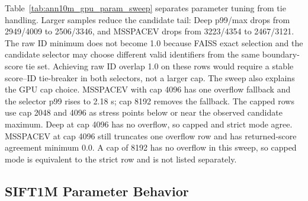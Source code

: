 Table~\ref{tab:ann10m_gpu_param_sweep} separates parameter tuning from tie
handling. Larger samples reduce the candidate tail: Deep p99/max drops from
2949/4009 to 2506/3346, and MSSPACEV drops from 3223/4354 to 2467/3121. The
raw ID minimum does not become 1.0 because FAISS exact selection and the
candidate selector may choose different valid identifiers from the same
boundary-score tie set. Achieving raw ID overlap 1.0 on these rows would require
a stable score--ID tie-breaker in both selectors, not a larger cap. The sweep
also explains the GPU cap choice. MSSPACEV with cap 4096 has one overflow
fallback and the selector p99 rises to 2.18 s; cap 8192 removes the fallback.
The capped rows use cap 2048 and 4096 as stress points below or near the
observed candidate maximum. Deep at cap 4096 has no overflow, so capped and
strict mode agree. MSSPACEV at cap 4096 still truncates one overflow row and
has returned-score agreement minimum 0.0. A cap of 8192 has no overflow in this
sweep, so capped mode is equivalent to the strict row and is not listed
separately.

\subsection{SIFT1M Parameter Behavior}

\begin{table}[!htbp]
\centering
\caption{FAISS SIFT1M flat-search rows on RTX 4090 using exact fallback.
Candidate statistics are p50/p95/p99/max. All rows have returned-score
agreement and tie-aware overlap 1.0.}%
\label{tab:faiss_sift1m}
\end{table}

